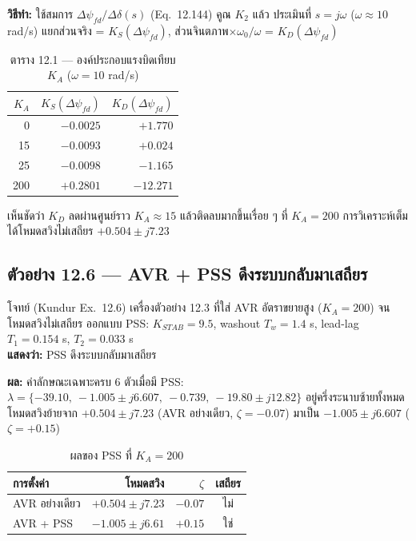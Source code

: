 \documentclass[12pt,a4paper]{article}
\newcommand{\ddel}{\Delta\delta}
\newcommand{\dpsifd}{\Delta\psi_{fd}}
\begin{document}
\textbf{วิธีทำ:} ใช้สมการ $\dpsifd/\ddel(s)$ (Eq.~12.144) คูณ $K_2$ แล้ว
ประเมินที่ $s=j\omega$ ($\omega\approx10$ rad/s) แยกส่วนจริง = $K_S(\dpsifd)$,
ส่วนจินตภาพ$\times\omega_0/\omega$ = $K_D(\dpsifd)$

\begin{table}[H]
\centering
\caption{ตาราง 12.1 --- องค์ประกอบแรงบิดเทียบ $K_A$ ($\omega=10$ rad/s)}
\begin{tabular}{@{}rrr@{}}
\toprule
$K_A$ & $K_S(\dpsifd)$ & $K_D(\dpsifd)$ \\
\midrule
0   & $-0.0025$ & $+1.770$ \\
15  & $-0.0093$ & $+0.024$ \\
25  & $-0.0098$ & $-1.165$ \\
200 & $+0.2801$ & $-12.271$ \\
\bottomrule
\end{tabular}
\end{table}

เห็นชัดว่า $K_D$ ลดผ่านศูนย์ราว $K_A \approx 15$ แล้วติดลบมากขึ้นเรื่อย ๆ
ที่ $K_A=200$ การวิเคราะห์เต็มได้โหมดสวิงไม่เสถียร $+0.504\pm j7.23$

\subsection{ตัวอย่าง 12.6 --- AVR + PSS ดึงระบบกลับมาเสถียร}

\begin{keybox}{โจทย์ (Kundur Ex.\ 12.6)}
เครื่องตัวอย่าง 12.3 ที่ใส่ AVR อัตราขยายสูง ($K_A=200$) จนโหมดสวิงไม่เสถียร
ออกแบบ PSS: $K_{STAB}=9.5$, washout $T_w=1.4$ s, lead-lag $T_1=0.154$ s,
$T_2=0.033$ s \\
\textbf{แสดงว่า:} PSS ดึงระบบกลับมาเสถียร
\end{keybox}

\textbf{ผล:} ค่าลักษณะเฉพาะครบ 6 ตัวเมื่อมี PSS:
$\lambda=\{-39.10,\ -1.005\pm j6.607,\ -0.739,\ -19.80\pm j12.82\}$
อยู่ครึ่งระนาบซ้ายทั้งหมด โหมดสวิงย้ายจาก $+0.504\pm j7.23$ (AVR อย่างเดียว,
$\zeta=-0.07$) มาเป็น $-1.005\pm j6.607$ ($\zeta=+0.15$)

\begin{table}[H]
\centering
\caption{ผลของ PSS ที่ $K_A=200$}
\begin{tabular}{@{}lrrc@{}}
\toprule
การตั้งค่า & โหมดสวิง & $\zeta$ & เสถียร \\
\midrule
AVR อย่างเดียว & $+0.504\pm j7.23$ & $-0.07$ & ไม่ \\
AVR + PSS      & $-1.005\pm j6.61$ & $+0.15$ & ใช่ \\
\bottomrule
\end{tabular}
\end{table}
\end{document}
